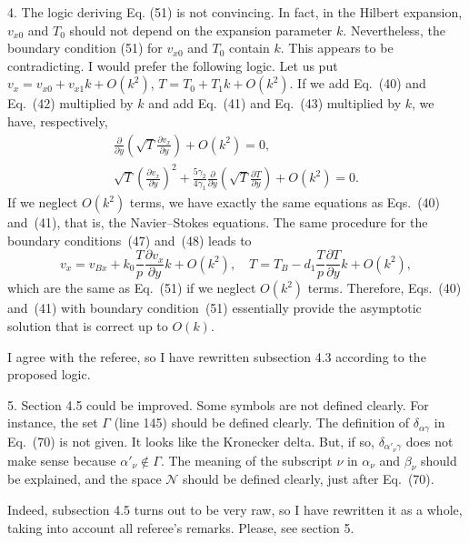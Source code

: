 \documentclass{article}
\newcommand{\pder}[2][]{\frac{\partial#1}{\partial#2}}
\newcommand{\Nu}{\mathcal{N}}
\newcommand{\OO}[1]{O(#1)}
\begin{document}
\begin{quoting}
4. The logic deriving Eq. (51) is not convincing. In fact, in the Hilbert expansion, \(v_{x0}\) and \(T_0\)
should not depend on the expansion parameter \(k\).
Nevertheless, the boundary condition (51) for \(v_{x0}\) and \(T_0\) contain \(k\).
This appears to be contradicting. I would prefer the following logic.
Let us put \(v_x = v_{x0} + v_{x1}k + \OO{k^2}\), \(T = T_0 + T_1k + \OO{k^2}\).
If we add Eq.~(40) and Eq.~(42) multiplied by \(k\) and add Eq.~(41) and Eq.~(43) multiplied by \(k\),
we have, respectively,
\begin{gather}
    \pder{y}\left(\sqrt{T}\pder[v_x]{y}\right) + \OO{k^2} = 0, \\
    \sqrt{T}\left(\pder[v_x]{y}\right)^2 + \frac{5\gamma_2}{4\gamma_1}\pder{y}\left(\sqrt{T}\pder[T]{y}\right) + \OO{k^2} = 0.
\end{gather}
If we neglect \(\OO{k^2}\) terms, we have exactly the same equations as Eqs.~(40) and~(41),
that is, the Navier–Stokes equations. The same procedure for the boundary conditions~(47) and~(48) leads to
\begin{equation}
    v_x = v_{Bx} + k_0\frac{T}{p}\pder[v_x]{y}k + \OO{k^2}, \quad T = T_B - d_1\frac{T}{p}\pder[T]{y}k + \OO{k^2},
\end{equation}
which are the same as Eq.~(51) if we neglect \(\OO{k^2}\) terms.
Therefore, Eqs.~(40) and~(41) with boundary condition~(51) essentially provide the asymptotic solution
that is correct up to \(\OO{k}\).
\end{quoting}

I agree with the referee, so I have rewritten subsection 4.3 according to the proposed logic.

\begin{quoting}
5. Section 4.5 could be improved. Some symbols are not defined clearly.
For instance, the set \(\Gamma\) (line 145) should be defined clearly.
The definition of \(\delta_{\alpha\gamma}\) in Eq.~(70) is not given.
It looks like the Kronecker delta.
But, if so, \(\delta_{\alpha'_\nu\gamma}\) does not make sense because \(\alpha'_\nu\notin\Gamma\).
The meaning of the subscript \(\nu\) in \(\alpha_\nu\) and \(\beta_\nu\) should be explained,
and the space \(\Nu\) should be defined clearly, just after Eq.~(70).
\end{quoting}

Indeed, subsection 4.5 turns out to be very raw, so I have rewritten it as a whole,
taking into account all referee's remarks. Please, see section 5.
\end{document}
